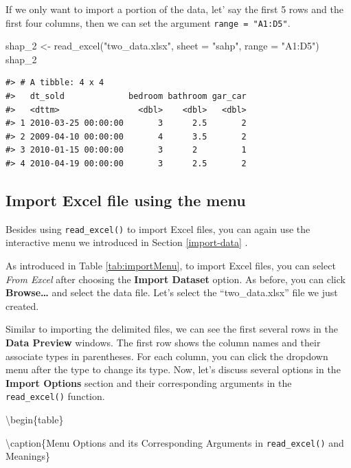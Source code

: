 \documentclass[
]{book}
\newenvironment{Shaded}{\begin{snugshade}}{\end{snugshade}}
\newcommand{\AttributeTok}[1]{\textcolor[rgb]{0.77,0.63,0.00}{#1}}
\newcommand{\FunctionTok}[1]{\textcolor[rgb]{0.00,0.00,0.00}{#1}}
\newcommand{\NormalTok}[1]{#1}
\newcommand{\OtherTok}[1]{\textcolor[rgb]{0.56,0.35,0.01}{#1}}
\newcommand{\StringTok}[1]{\textcolor[rgb]{0.31,0.60,0.02}{#1}}
\begin{document}
If we only want to import a portion of the data, let' say the first 5 rows and the first four columns, then we can set the argument \texttt{range\ =\ "A1:D5"}.

\begin{Shaded}
\begin{Highlighting}[]
\NormalTok{shap\_2 }\OtherTok{\textless{}{-}} \FunctionTok{read\_excel}\NormalTok{(}\StringTok{"two\_data.xlsx"}\NormalTok{, }\AttributeTok{sheet =} \StringTok{"sahp"}\NormalTok{, }\AttributeTok{range =} \StringTok{"A1:D5"}\NormalTok{)}
\NormalTok{shap\_2}
\end{Highlighting}
\end{Shaded}

\begin{verbatim}
#> # A tibble: 4 x 4
#>   dt_sold             bedroom bathroom gar_car
#>   <dttm>                <dbl>    <dbl>   <dbl>
#> 1 2010-03-25 00:00:00       3      2.5       2
#> 2 2009-04-10 00:00:00       4      3.5       2
#> 3 2010-01-15 00:00:00       3      2         1
#> 4 2010-04-19 00:00:00       3      2.5       2
\end{verbatim}

\hypertarget{import-excel-file-using-the-menu}{%
\subsection{Import Excel file using the menu}\label{import-excel-file-using-the-menu}}

Besides using \texttt{read\_excel()} to import Excel files, you can again use the interactive menu we introduced in Section \ref{import-data} .

As introduced in Table \ref{tab:importMenu}, to import Excel files, you can select \emph{From Excel} after choosing the \textbf{Import Dataset} option. As before, you can click \textbf{Browse\ldots{}} and select the data file. Let's select the ``two\_data.xlsx'' file we just created.

Similar to importing the delimited files, we can see the first several rows in the \textbf{Data Preview} windows. The first row shows the column names and their associate types in parentheses. For each column, you can click the dropdown menu after the type to change its type. Now, let's discuss several options in the \textbf{Import Options} section and their corresponding arguments in the \texttt{read\_excel()} function.

\textbackslash begin\{table\}

\textbackslash caption\{\label{tab:importExcelOptions}Menu Options and its Corresponding Arguments in \texttt{read\_excel()} and Meanings\}
\centering
\end{document}
